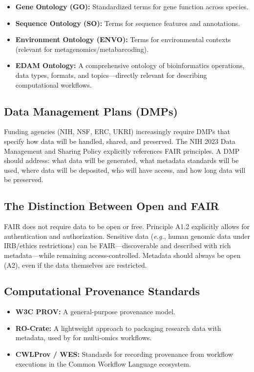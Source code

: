 \begin{itemize}
\item \textbf{Gene Ontology (GO):} Standardized terms for gene function across species.
\item \textbf{Sequence Ontology (SO):} Terms for sequence features and annotations.
\item \textbf{Environment Ontology (ENVO):} Terms for environmental contexts (relevant for metagenomics/metabarcoding).
\item \textbf{EDAM Ontology:} A comprehensive ontology of bioinformatics operations, data types, formats, and topics---directly relevant for describing computational workflows.
\end{itemize}

\subsection{Data Management Plans (DMPs)}

Funding agencies (NIH, NSF, ERC, UKRI) increasingly require DMPs that specify how data will be handled, shared, and preserved. The NIH 2023 Data Management and Sharing Policy explicitly references FAIR principles. A DMP should address: what data will be generated, what metadata standards will be used, where data will be deposited, who will have access, and how long data will be preserved.

\subsection{The Distinction Between Open and FAIR}

FAIR does not require data to be open or free. Principle A1.2 explicitly allows for authentication and authorization. Sensitive data (\textit{e.g.}, human genomic data under IRB/ethics restrictions) can be FAIR---discoverable and described with rich metadata---while remaining access-controlled. Metadata should always be open (A2), even if the data themselves are restricted.

\subsection{Computational Provenance Standards}

\begin{itemize}
\item \textbf{W3C PROV:} A general-purpose provenance model.
\item \textbf{RO-Crate:} A lightweight approach to packaging research data with metadata, used by \textcite{niehues2024} for multi-omics workflows.
\item \textbf{CWLProv / WES:} Standards for recording provenance from workflow executions in the Common Workflow Language ecosystem.
\end{itemize}

